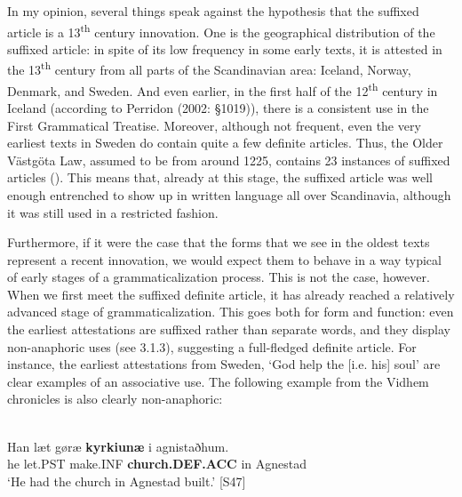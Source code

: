 
In my opinion, several things speak against the hypothesis that the suffixed article is a 13\textsuperscript{th} century innovation. One is the geographical distribution of the suffixed article: in spite of its low frequency in some early texts, it is attested in the 13\textsuperscript{th} century from all parts of the Scandinavian area: Iceland, Norway, Denmark, and Sweden.  And even earlier, in the first half of the 12\textsuperscript{th} century in Iceland (according to Perridon (2002: §1019)), there is a consistent use in the First Grammatical Treatise. Moreover, although not frequent, even the very earliest texts in Sweden do contain quite a few definite articles. Thus, the Older Västgöta Law, assumed to be from around 1225, contains 23 instances of suffixed articles (\citet[24]{Larm1936}). This means that, already at this stage, the suffixed article was well enough entrenched to show up in written language all over Scandinavia, although it was still used in a restricted fashion. 


Furthermore, if it were the case that the forms that we see in the oldest texts represent a recent innovation, we would expect them to behave in a way typical of early stages of a grammaticalization process. This is not the case, however. When we first meet the suffixed definite article, it has already reached a relatively advanced stage of grammaticalization. This goes both for form and function: even the earliest attestations are suffixed rather than separate words, and they display non-anaphoric uses (see 3.1.3), suggesting a full-fledged definite article. For instance, the earliest attestations from Sweden, ‘God help the [i.e. his] soul’ are clear examples of an associative use. The following example from the Vidhem chronicles is also clearly non-anaphoric:


\ea\label{}
\\
\gll 	Han  læt  gøræ  \textbf{kyrkiunæ} i  agnistaðhum.\\
		he  let.PST  make.INF  \textbf{church.DEF.ACC} in  Agnestad\\
\glt 	‘He had the church in Agnestad built.’ [S47]


